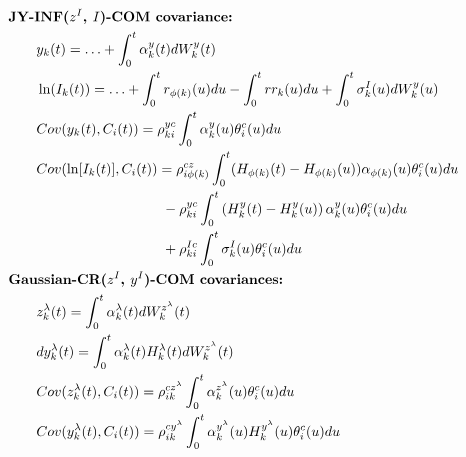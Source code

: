 \documentclass[]{article}
\begin{document}
%
\begin{align}
%
&\text{\textbf{JY-INF($z^I$, $I$)-COM covariance:} } \nonumber \\
& \quad\quad  y_k(t)= \ldots + \int_0^t \alpha^y_k(t) dW^{y}_k(t) \nonumber \\
& \quad\quad \ln(I_k(t)) = \ldots + \int_0^t r_{\phi(k)}(u) du - \int_0^t rr_{k}(u) du + \int_0^t \sigma^I_k(u)dW^y_k(u)\nonumber \\
&\quad\quad Cov( y_k(t) , C_i(t)) = \rho^{yc}_{ki}   \int_0^t  \alpha^{y}_{k}(u) \theta^c_i(u) du\nonumber \\
&\quad\quad Cov(\ln[I_{k}(t)], C_i(t)) = \rho^{c z }_{i\phi(k)}  \int_0^t  (H_{\phi(k)}(t) - H_{\phi(k)}(u)) \alpha_{\phi(k)}(u) \theta^c_i(u) du \nonumber \\
&\quad\quad \quad\quad \quad\quad\quad\quad\quad\quad \quad- \rho^{yc}_{ki}  \int_0^t \left( H^{y}_{k}(t) - H^{y}_{k}(u) \right)\alpha^{y}_{k}(u) \theta^c_i(u) du  \nonumber \\
&\quad\quad \quad\quad \quad\quad\quad\quad \quad\quad \quad+\rho^{Ic}_{ki}   \int_0^t  \sigma^I_{k}(u) \theta^c_i(u)du\nonumber \\
%
&\text{\textbf{Gaussian-CR($z^I$, $y^I$)-COM covariances:} } \nonumber \\
& \quad\quad z^{\lambda}_k(t) = \int_0^t \alpha^{\lambda}_k(t) dW^{z^{\lambda}}_k(t) \nonumber \\
& \quad\quad dy^{\lambda}_k(t) = \int_0^t\alpha^{\lambda}_k(t) H^{\lambda}_k(t) dW^{z^{\lambda}}_k(t) \nonumber \\
&\quad\quad Cov( z^{\lambda}_k(t) , C_i(t)) = \rho^{cz^{\lambda}}_{ik}   \int_0^t  \alpha^{z^{\lambda}}_{k}(u) \theta^c_i(u) du\nonumber \\
&\quad\quad Cov(y^{\lambda}_k(t) , C_i(t)) = \rho^{cy^{\lambda}}_{ik}   \int_0^t  \alpha^{y^{\lambda}}_{k}(u) H^{y^{\lambda}}_{k}(u) \theta^c_i(u) du\nonumber
\end{align}
%
\end{document}

